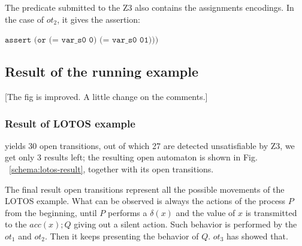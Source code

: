 \documentclass{lncs/llncs}
\newcommand{\TODO}[1]{\textcolor{red}{\textbf{[TODO:#1]}}}
\newcommand{\OTvar}{\texttt}
\newcommand{\QIN}[1]{\textcolor{airforceblue}{#1}}
\begin{document}
\noindent The predicate submitted to the Z3 also contains the
assignments encodings.
In the case of $ot_2$, it
gives the assertion:\\
\centerline{$\OTvar{assert (or (= var\_s0 0) (= var\_s0 01)))}$}


\subsection{Result of the running example}
\label{section:full-result}

\QIN{[The fig is improved. A little change on the comments.]}

\subsubsection{Result of LOTOS example}

\QIN{
yields 30 open
transitions, out of which 27 are detected unsatisfiable by Z3, we
get only 3 results left; the resulting open automaton is shown in
Fig. ~\ref{schema:lotos-result}, together with its open transitions.
}

\QIN{
The final result open transitions represent all the
possible movements of the LOTOS example.
What can be observed is always the actions of the process $P$ from the beginning, until $P$ performs a $\delta(x)$ and the value of
$x$ is transmitted to the $acc(x);Q$ giving out a silent action. Such behavior is performed by the $ot_1$ and $ot_2$. 
Then it keeps presenting the behavior of $Q$. $ot_3$ has showed that. 
}
\end{document}
